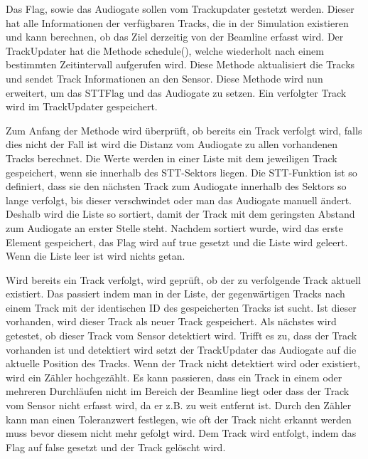 Das Flag, sowie das Audiogate sollen vom Trackupdater gestetzt werden. Dieser hat alle Informationen der verfügbaren Tracks, die in der Simulation 
existieren und kann berechnen, ob das Ziel derzeitig von der Beamline erfasst wird. Der TrackUpdater hat die Methode schedule(), welche wiederholt nach 
einem bestimmten Zeitintervall aufgerufen wird. Diese Methode aktualisiert die Tracks und sendet Track Informationen an den Sensor. Diese Methode wird 
nun erweitert, um das STTFlag und das Audiogate zu setzen. Ein verfolgter Track wird im TrackUpdater gespeichert.

Zum Anfang der Methode wird überprüft, ob bereits ein Track verfolgt wird, falls dies nicht der Fall ist wird die Distanz vom Audiogate zu allen 
vorhandenen Tracks berechnet. Die Werte werden in einer Liste mit dem jeweiligen Track gespeichert, wenn sie innerhalb des STT-Sektors liegen. Die 
STT-Funktion ist so definiert, dass sie den nächsten Track zum Audiogate innerhalb des Sektors so lange verfolgt, bis dieser verschwindet oder man das 
Audiogate manuell ändert. Deshalb wird die Liste so sortiert, damit der Track mit dem geringsten Abstand zum Audiogate an erster Stelle steht. Nachdem 
sortiert wurde, wird das erste Element gespeichert, das Flag wird auf true gesetzt und die Liste wird geleert. Wenn die Liste leer ist wird nichts getan. 

Wird bereits ein Track verfolgt, wird geprüft, ob der zu verfolgende Track aktuell existiert. Das passiert indem man in der Liste, der gegenwärtigen 
Tracks nach einem Track mit der identischen ID des gespeicherten Tracks ist sucht. Ist dieser vorhanden, wird dieser Track als neuer Track gespeichert. 
Als nächstes wird getestet, ob dieser Track vom Sensor detektiert wird.  Trifft es zu, dass der Track vorhanden ist und detektiert wird setzt der 
TrackUpdater das Audiogate auf die aktuelle Position des Tracks. Wenn der Track nicht detektiert wird oder existiert, wird ein Zähler hochgezählt. Es 
kann passieren, dass ein Track in einem oder mehreren Durchläufen nicht im Bereich der Beamline liegt oder dass der Track vom Sensor nicht erfasst wird, 
da er z.B. zu weit entfernt ist. Durch den Zähler kann man einen Toleranzwert festlegen, wie oft der Track nicht erkannt werden muss bevor diesem nicht 
mehr gefolgt wird. Dem Track wird entfolgt, indem das Flag auf false gesetzt und der Track gelöscht wird.

